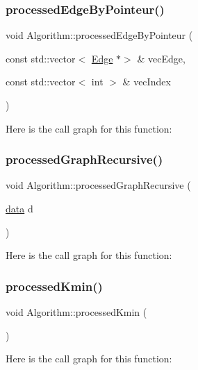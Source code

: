 \subsubsection{\texorpdfstring{processed\+Edge\+By\+Pointeur()}{processedEdgeByPointeur()}}
{\footnotesize\ttfamily void Algorithm\+::processed\+Edge\+By\+Pointeur (\begin{DoxyParamCaption}\item[{const std\+::vector$<$ \mbox{\hyperlink{class_edge}{Edge}} $\ast$$>$ \&}]{vec\+Edge,  }\item[{const std\+::vector$<$ int $>$ \&}]{vec\+Index }\end{DoxyParamCaption})}

Here is the call graph for this function\+:
\mbox{\label{struct_algorithm_aa3909b7cd8efd5c0d2351bcb7923e888}} 
\subsubsection{\texorpdfstring{processed\+Graph\+Recursive()}{processedGraphRecursive()}}
{\footnotesize\ttfamily void Algorithm\+::processed\+Graph\+Recursive (\begin{DoxyParamCaption}\item[{\mbox{\hyperlink{_graph_8h_a98cbe1f79429fc62806b32b6e8871d9e}{data}}}]{d }\end{DoxyParamCaption})}

Here is the call graph for this function\+:
\mbox{\label{struct_algorithm_a659a436333cd45d8a3c9b5a6b83ca262}} 
\subsubsection{\texorpdfstring{processed\+Kmin()}{processedKmin()}}
{\footnotesize\ttfamily void Algorithm\+::processed\+Kmin (\begin{DoxyParamCaption}{ }\end{DoxyParamCaption})}

Here is the call graph for this function\+:
\mbox{\label{struct_algorithm_aa921d8fcc6fa4f434f19c800cda14511}} 
